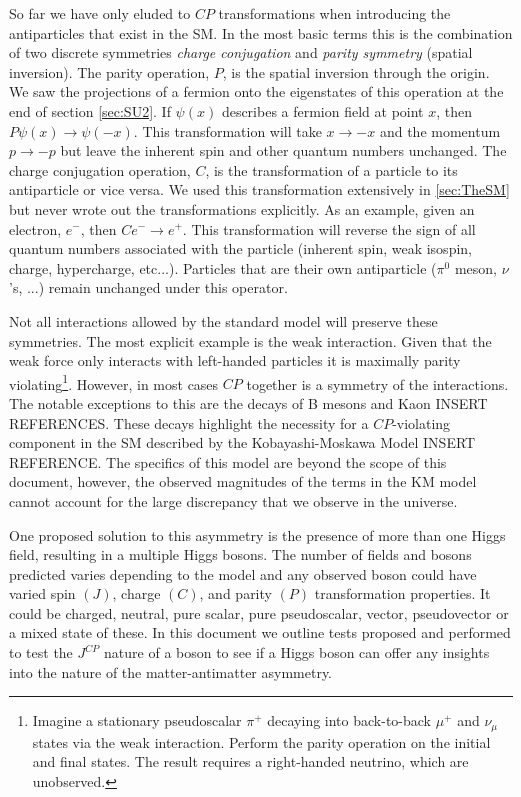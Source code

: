 So far we have only eluded to $CP$ transformations when introducing the antiparticles that exist in the SM. In the most basic terms this is the combination of two discrete symmetries \textit{charge conjugation} and \textit{parity symmetry} (spatial inversion). The parity operation, $P$, is the spatial inversion through the origin. We saw the projections of a fermion onto the eigenstates of this operation at the end of section \ref{sec:SU2}. If $\psi\left(x\right)$ describes a fermion field at point $x$, then $P\psi\left(x\right) \to \psi\left(-x\right)$. This transformation will take $x \to -x$ and the momentum $p \to -p$ but leave the inherent spin and other quantum numbers unchanged. The charge conjugation operation, $C$, is the transformation of a particle to its antiparticle or vice versa. We used this transformation extensively in \ref{sec:TheSM} but never wrote out the transformations explicitly. As an example, given an electron, $e^{-}$, then $Ce^{-} \to e^{+}$. This transformation will reverse the sign of all quantum numbers associated with the particle (inherent spin, weak isospin, charge, hypercharge, etc...). Particles that are their own antiparticle ($\pi^0$ meson, $\nu$'s, ...) remain unchanged under this operator.

Not all interactions allowed by the standard model will preserve these symmetries. The most explicit example is the weak interaction. Given that the weak force only interacts with left-handed particles it is maximally parity violating\footnote{Imagine a stationary pseudoscalar $\pi^{+}$ decaying into back-to-back $\mu^{+}$ and $\nu_{\mu}$ states via the weak interaction. Perform the parity operation on the initial and final states. The result requires a right-handed neutrino, which are unobserved.}. However, in most cases $CP$ together is a symmetry of the interactions. The notable exceptions to this are the decays of B mesons and Kaon INSERT REFERENCES. These decays highlight the necessity for a $CP$-violating component in the SM described by the Kobayashi-Moskawa Model INSERT REFERENCE. The specifics of this model are beyond the scope of this document, however, the observed magnitudes of the terms in the KM model cannot account for the large discrepancy that we observe in the universe.

One proposed solution to this asymmetry is the presence of more than one Higgs field, resulting in a multiple Higgs bosons. The number of fields and bosons predicted varies depending to the model and any observed boson could have varied spin $(J)$, charge $(C)$, and parity $(P)$ transformation properties. It could be charged, neutral, pure scalar, pure pseudoscalar, vector, pseudovector or a mixed state of these. In this document we outline tests proposed and performed to test the $J^{CP}$ nature of a boson to see if a Higgs boson can offer any insights into the nature of the matter-antimatter asymmetry.

